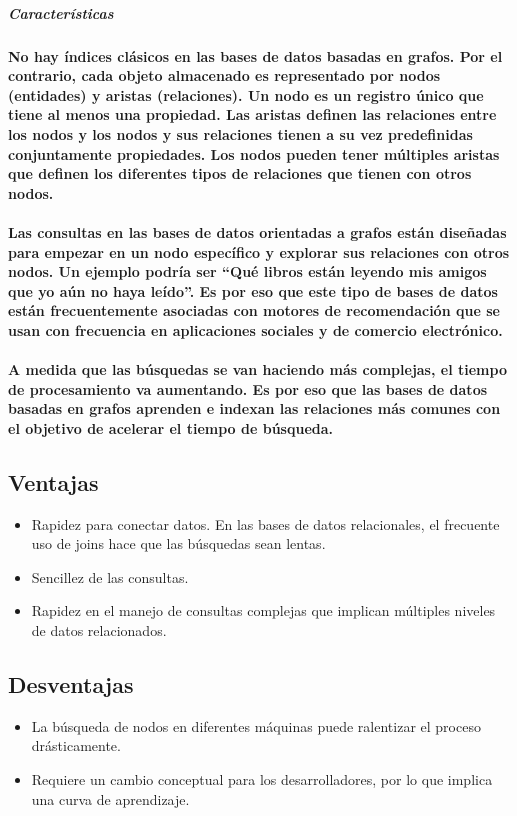 \subparagraph{Características}
\paragraph{No hay índices clásicos en las bases de datos basadas en grafos. Por el contrario, cada objeto almacenado es representado por nodos (entidades) y aristas (relaciones). Un nodo es un registro único que tiene al menos una propiedad. Las aristas definen las relaciones entre los nodos y los nodos y sus relaciones tienen a su vez predefinidas conjuntamente propiedades. Los nodos pueden tener múltiples aristas que definen los diferentes tipos de relaciones que tienen con otros nodos.}

\paragraph{Las consultas en las bases de datos orientadas a grafos están diseñadas para empezar en un nodo específico y explorar sus relaciones con otros nodos. Un ejemplo podría ser “Qué libros están leyendo mis amigos que yo aún no haya leído”. Es por eso que este tipo de bases de datos están frecuentemente asociadas con motores de recomendación que se usan con frecuencia en aplicaciones sociales y de comercio electrónico.}

\paragraph{A medida que las búsquedas se van haciendo más complejas, el tiempo de procesamiento va aumentando. Es por eso que las bases de datos basadas en grafos aprenden e indexan las relaciones más comunes con el objetivo de acelerar el tiempo de búsqueda.}
\subsection{Ventajas}
\begin{itemize}
  \item Rapidez para conectar datos. En las bases de datos relacionales, el frecuente uso de joins hace que las búsquedas sean lentas.
  \item Sencillez de las consultas.
  \item Rapidez en el manejo de consultas complejas que implican múltiples niveles de datos relacionados.
\end{itemize}   
\subsection{Desventajas} 
\begin{itemize}
  \item La búsqueda de nodos en diferentes máquinas puede ralentizar el proceso drásticamente.
  \item Requiere un cambio conceptual para los desarrolladores, por lo que implica una curva de aprendizaje.
\end{itemize}   
\newpage
